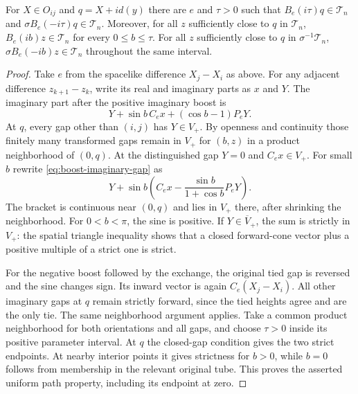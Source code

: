 \begin{lemma}\label{lem:imaginary-boost-path}
For $X\in O_{ij}$ and $q=X+i d(y)$ there are $e$ and $\tau>0$ such that
$B_e(i\tau)q\in\mathcal T_n$ and
$\sigma B_e(-i\tau)q\in\mathcal T_n$.
Moreover, for all $z$ sufficiently close to $q$ in $\mathcal T_n$,
$B_e(ib)z\in\mathcal T_n$ for every $0\leq b\leq\tau$.
For all $z$ sufficiently close to $q$ in $\sigma^{-1}\mathcal T_n$,
$\sigma B_e(-ib)z\in\mathcal T_n$ throughout the same interval.
\end{lemma}
\begin{proof}
Take $e$ from the spacelike difference $X_j-X_i$ as above.
For any adjacent difference $z_{k+1}-z_k$, write its real and imaginary
parts as $x$ and $Y$. The imaginary part after the positive imaginary
boost is
\begin{equation}\label{eq:boost-imaginary-gap}
 Y+\sin b\,C_ex+(\cos b-1)P_eY.
\end{equation}
At $q$, every gap other than $(i,j)$ has $Y\in V_+$. By openness and
continuity those finitely many transformed gaps remain in $V_+$ for
$(b,z)$ in a product neighborhood of $(0,q)$.
At the distinguished gap $Y=0$ and $C_ex\in V_+$. For small $b$ rewrite
\eqref{eq:boost-imaginary-gap} as
\[
 Y+\sin b\left(C_ex-\frac{\sin b}{1+\cos b}P_eY\right).
\]
The bracket is continuous near $(0,q)$ and lies in $V_+$ there, after
shrinking the neighborhood. For $0<b<\pi$, the sine is positive.
If $Y\in\overline V_+$, the sum is strictly in $V_+$: the spatial
triangle inequality shows that a closed forward-cone vector plus a
positive multiple of a strict one is strict.

For the negative boost followed by the exchange, the original tied gap
is reversed and the sine changes sign. Its inward vector is again
$C_e(X_j-X_i)$. All other imaginary gaps at $q$ remain strictly forward,
since the tied heights agree and are the only tie. The same neighborhood
argument applies. Take a common product neighborhood for both orientations
and all gaps, and choose $\tau>0$ inside its positive parameter interval.
At $q$ the closed-gap condition gives the two strict endpoints. At nearby
interior points it gives strictness for $b>0$, while $b=0$ follows from
membership in the relevant original tube. This proves the asserted
uniform path property, including its endpoint at zero.
\end{proof}

